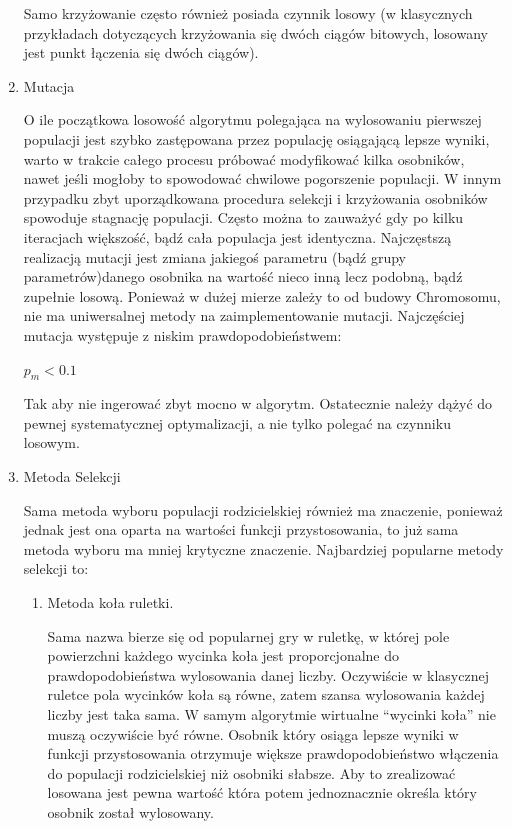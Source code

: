 \begin{par}
\begin{enumerate}
\begin{par}
		Samo krzyżowanie często również posiada czynnik losowy (w klasycznych przykładach dotyczących krzyżowania się dwóch ciągów bitowych, losowany jest punkt łączenia się dwóch ciągów).
	\end{par}
\item Mutacja
	\begin{par}
		O ile początkowa losowość algorytmu polegająca na wylosowaniu pierwszej populacji jest szybko zastępowana przez populację osiągającą lepsze wyniki, 
		warto w trakcie całego procesu próbować modyfikować kilka osobników, nawet jeśli mogłoby to spowodować chwilowe pogorszenie populacji. 
		W innym przypadku zbyt uporządkowana procedura selekcji i krzyżowania osobników spowoduje stagnację populacji.
		Często można to zauważyć gdy po kilku iteracjach większość, bądź cała populacja jest identyczna.
		Najczęstszą realizacją mutacji jest zmiana jakiegoś parametru (bądź grupy parametrów)danego osobnika na wartość nieco inną lecz podobną, bądź zupełnie losową.
		Ponieważ w dużej mierze zależy to od budowy Chromosomu, nie ma uniwersalnej metody na zaimplementowanie mutacji.
		Najczęściej mutacja występuje z niskim prawdopodobieństwem:
		\begin{center}
			$p_m < 0.1$
		\end{center}
		Tak aby nie ingerować zbyt mocno w algorytm. Ostatecznie należy dążyć do pewnej systematycznej optymalizacji, a nie tylko polegać na czynniku losowym.
	\end{par}
\item Metoda Selekcji
	\begin{par}
		Sama metoda wyboru populacji rodzicielskiej również ma znaczenie, ponieważ jednak jest ona oparta na wartości funkcji przystosowania, to już sama metoda wyboru ma mniej krytyczne znaczenie.
		Najbardziej popularne metody selekcji to:
		\begin{enumerate}
			\item Metoda koła ruletki.
				\begin{par}
					Sama nazwa bierze się od popularnej gry w ruletkę, w której pole powierzchni każdego wycinka koła jest proporcjonalne do prawdopodobieństwa wylosowania danej liczby. 
					Oczywiście w klasycznej ruletce pola wycinków koła są równe, zatem szansa wylosowania każdej liczby jest taka sama.
					W samym algorytmie wirtualne ``wycinki koła'' nie muszą oczywiście być równe. 
					Osobnik który osiąga lepsze wyniki w funkcji przystosowania otrzymuje większe prawdopodobieństwo włączenia do populacji rodzicielskiej niż osobniki słabsze. 
					Aby to zrealizować losowana jest pewna wartość która potem jednoznacznie określa który osobnik został wylosowany.

\end{par}
\end{enumerate}
\end{par}
\end{enumerate}
\end{par}
